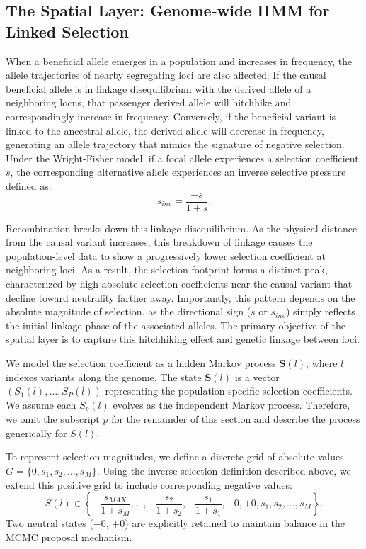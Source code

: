 \documentclass{article}
\begin{document}
\subsection{The Spatial Layer: Genome-wide HMM for Linked Selection}

When a beneficial allele emerges in a population and increases in frequency, the allele trajectories of nearby segregating loci are also affected.
If the causal beneficial allele is in linkage disequilibrium with the derived allele of a neighboring locus, that passenger derived allele will hitchhike and correspondingly increase in frequency.
Conversely, if the beneficial variant is linked to the ancestral allele, the derived allele will decrease in frequency, generating an allele trajectory that mimics the signature of negative selection.
Under the Wright-Fisher model, if a focal allele experiences a selection coefficient $s$, the corresponding alternative allele experiences an inverse selective pressure defined as:
$$s_{inv} = \frac{-s}{1+s}.$$

Recombination breaks down this linkage disequilibrium.
As the physical distance from the causal variant increases, this breakdown of linkage causes the population-level data to show a progressively lower selection coefficient at neighboring loci.
As a result, the selection footprint forms a distinct peak, characterized by high absolute selection coefficients near the causal variant that decline toward neutrality farther away.
Importantly, this pattern depends on the absolute magnitude of selection, as the directional sign ($ s $ or $ s_{inv} $) simply reflects the initial linkage phase of the associated alleles.
The primary objective of the spatial layer is to capture this hitchhiking effect and genetic linkage between loci.

We model the selection coefficient as a hidden Markov process $\mathbf{S}(l)$, where $l$ indexes variants along the genome.
The state $ \mathbf{S}(l) $ is a vector $ (S_1(l), \dots, S_P(l)) $ representing the population-specific selection coefficients.
We assume each $S_p(l)$ evolves as the independent Markov process.
Therefore, we omit the subscript $ p $ for the remainder of this section and describe the process generically for $S(l)$.

To represent selection magnitudes, we define a discrete grid of absolute values $G = \{0, s_1, s_2, \dots, s_M\}$.
Using the inverse selection definition described above, we extend this positive grid to include corresponding negative values:
\begin{equation}\label{eq:sel_grid}
S(l) \in \left\{ - \frac{s_{MAX}}{1+s_{M}}, \dots,  - \frac{s_2}{1+s_2}, - \frac{s_1}{1+s_1}, -0, +0, s_1, s_2, \dots, s_{M}\right\}.
\end{equation}
Two neutral states ($-0$, $+0$) are explicitly retained to maintain balance in the MCMC proposal mechanism.
\end{document}
